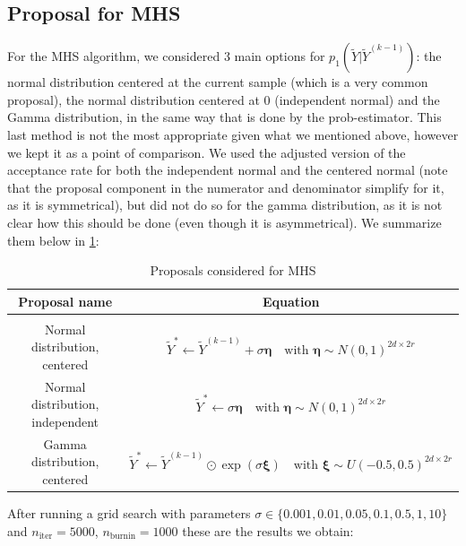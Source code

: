 \documentclass[12pt]{memoir}
\newcommand{\nitern}[1]{$n_{\text{iter}}=#1$}
\newcommand{\nburninn}[1]{$n_{\text{burnin}}=#1$}
\begin{document}
\subsection*{Proposal for MHS}
For the MHS algorithm, we considered 3 main options for $p_1(\tilde Y| \tilde Y ^{(k-1)})$: the normal distribution centered at the current sample (which is a very common proposal), the normal distribution centered at 0 (independent normal) and the Gamma distribution, in the same way that is done by the prob-estimator. This last method is not the most appropriate given what we mentioned above, however we kept it as a point of comparison. We used the adjusted version of the acceptance rate for both the independent normal and the centered normal (note that the proposal component in the numerator and denominator simplify for it, as it is symmetrical), but did not do so for the gamma distribution, as it is not clear how this should be done (even though it is asymmetrical). We summarize them below in \ref{table:proposal-comp-mhs}:
\begin{table}[H]

    \begin{center}
        \begin{tabular}{|c|c|}
            \hline
            Proposal name & Equation\\
            \hline\hline
             & \\[-10pt]
            Normal distribution, centered & $\tilde Y^* \gets \tilde Y^{(k-1)} + \sigma \boldsymbol{\eta} \quad\text{with } \boldsymbol{\eta} \sim N(0,1)^{2d\times 2r}$\\
            Normal distribution, independent & $\tilde Y^* \gets \sigma \boldsymbol{\eta} \quad\text{with } \boldsymbol{\eta} \sim N(0, 1)^{2d \times 2r}$\\
            Gamma distribution, centered & $\tilde Y^* \gets \tilde Y^{(k-1)} \odot \exp (\sigma\boldsymbol{\xi})\quad \text{with } \boldsymbol{\xi} \sim U(-0.5, 0.5)^{2d\times 2r}$\\\hline
        \end{tabular}
\end{center}
\caption{Proposals considered for MHS}
\label{table:proposal-comp-mhs}
\end{table}

After running a grid search with parameters $\sigma\in \{0.001, 0.01, 0.05, 0.1, 0.5, 1, 10\}$ and \nitern{5000}, \nburninn{1000} these are the results we obtain: 
\end{document}
